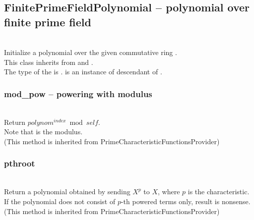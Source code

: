  \subsection{FinitePrimeFieldPolynomial -- polynomial over finite prime field}
 \initialize
  \\
  \spacing
  \quad Initialize a polynomial over the given commutative ring .\\
  \spacing
  \quad This class inherits from  and
  .\\
  \spacing
  \quad The type of the  is .
   is an instance of descendant of .
  \method
  \subsubsection{mod\_pow -- powering with modulus}
  \\
  \spacing
  \quad Return \(polynom ^ {index} \bmod self\).\\
  \spacing
  \quad Note that  is the modulus.\\
  (This method is inherited from PrimeCharacteristicFunctionsProvider)

  \subsubsection{pthroot}
  \\
  \spacing
  \quad Return a polynomial obtained by sending \(X^p\) to \(X\),
  where \(p\) is the characteristic. If the polynomial does not consist
  of \(p\)-th powered terms only, result is nonsense.\\
  (This method is inherited from PrimeCharacteristicFunctionsProvider)

